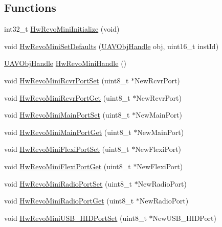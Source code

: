 \subsection*{\-Functions}
\begin{DoxyCompactItemize}
\item 
int32\-\_\-t \hyperlink{group___hw_revo_mini_gae974334ee828567c6fcb603a3a021705}{\-Hw\-Revo\-Mini\-Initialize} (void)
\item 
void \hyperlink{group___hw_revo_mini_gad78a873dda58556f9aa676d655898b84}{\-Hw\-Revo\-Mini\-Set\-Defaults} (\hyperlink{targets_2_u_a_v_objects_2inc_2uavobjectmanager_8h_a279053e22be53ce9f895043aaeb91e3b}{\-U\-A\-V\-Obj\-Handle} obj, uint16\-\_\-t inst\-Id)
\item 
\hyperlink{targets_2_u_a_v_objects_2inc_2uavobjectmanager_8h_a279053e22be53ce9f895043aaeb91e3b}{\-U\-A\-V\-Obj\-Handle} \hyperlink{group___hw_revo_mini_ga0e2dd9f38fce48723ed8742c2d2a4ef0}{\-Hw\-Revo\-Mini\-Handle} ()
\item 
void \hyperlink{group___hw_revo_mini_gad9e37a8d1c1305f0e231caab9e2bf9c1}{\-Hw\-Revo\-Mini\-Rcvr\-Port\-Set} (uint8\-\_\-t $\ast$\-New\-Rcvr\-Port)
\item 
void \hyperlink{group___hw_revo_mini_ga350c377c03730f48dca1491026f7a588}{\-Hw\-Revo\-Mini\-Rcvr\-Port\-Get} (uint8\-\_\-t $\ast$\-New\-Rcvr\-Port)
\item 
void \hyperlink{group___hw_revo_mini_gadcd37d5c594858ba3c391c83c8ae2c89}{\-Hw\-Revo\-Mini\-Main\-Port\-Set} (uint8\-\_\-t $\ast$\-New\-Main\-Port)
\item 
void \hyperlink{group___hw_revo_mini_ga3ec33f615f98daf57718c9418f134723}{\-Hw\-Revo\-Mini\-Main\-Port\-Get} (uint8\-\_\-t $\ast$\-New\-Main\-Port)
\item 
void \hyperlink{group___hw_revo_mini_ga6115b894da919fda0b304c37fb0a1a19}{\-Hw\-Revo\-Mini\-Flexi\-Port\-Set} (uint8\-\_\-t $\ast$\-New\-Flexi\-Port)
\item 
void \hyperlink{group___hw_revo_mini_gaec90fb22d2ae4b00019f6f342046fd88}{\-Hw\-Revo\-Mini\-Flexi\-Port\-Get} (uint8\-\_\-t $\ast$\-New\-Flexi\-Port)
\item 
void \hyperlink{group___hw_revo_mini_ga0cb7aad0b7ffd78b3abb4d40f98433f8}{\-Hw\-Revo\-Mini\-Radio\-Port\-Set} (uint8\-\_\-t $\ast$\-New\-Radio\-Port)
\item 
void \hyperlink{group___hw_revo_mini_gadc4fe4bf432efdc1ca3c638edaaafb76}{\-Hw\-Revo\-Mini\-Radio\-Port\-Get} (uint8\-\_\-t $\ast$\-New\-Radio\-Port)
\item 
void \hyperlink{group___hw_revo_mini_ga8e6bb62c5f1f34cad20c67d56d2aea1b}{\-Hw\-Revo\-Mini\-U\-S\-B\-\_\-\-H\-I\-D\-Port\-Set} (uint8\-\_\-t $\ast$\-New\-U\-S\-B\-\_\-\-H\-I\-D\-Port)

\end{DoxyCompactItemize}
